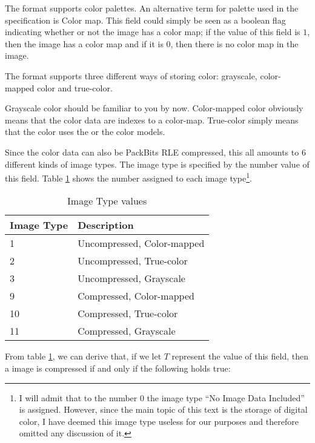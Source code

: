 
The \tga format supports color palettes. An alternative term for
palette used in the \tga specification is Color map. This field could simply be seen as a boolean flag indicating
whether or not the image has a color map; if the value of this field
is $1$, then the image has a color map and if it is $0$, then there is
no color map in the image.


The \tga format supports three different ways of storing color:
grayscale, color-mapped color and
true-color.

Grayscale color should be familiar to you by now. Color-mapped color
obviously means that the color data are indexes to a
color-map. True-color simply means that the color uses the \rgb or the
\rgba color models.


Since the color data can also be PackBits RLE compressed, this all amounts to $6$
different kinds of image types. The image type is specified by the
number value of this field. Table \ref{tab:imgtype} shows the number
assigned to each image type\footnote{I will admit that to the number
  $0$ the image type ``No Image Data Included'' is assigned. However,
  since the main topic of this text is the storage of digital color, I
have deemed this image type useless for our purposes and therefore
omitted any discussion of it.}.

\begin{table}
  \centering
  \begin{tabular}{ll}
    \toprule
    Image Type & Description \\
    \midrule
    1 & Uncompressed, Color-mapped \\
    2 & Uncompressed, True-color \\
    3 & Uncompressed, Grayscale\\
    9 & Compressed, Color-mapped \\
    10 & Compressed, True-color \\
    11 & Compressed, Grayscale\\
    \bottomrule
  \end{tabular}
  \caption{\tga Image Type values}
  \label{tab:imgtype}
\end{table}

From table \ref{tab:imgtype}, we can derive that, if we let $T$
represent the value of this field, then a \tga image is compressed if
and only if the following holds true:

